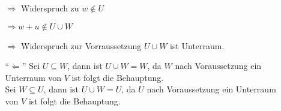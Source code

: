 \documentclass{scrreprt}
\begin{document}
\begin{enumerate}[(a)]
\begin{itemize}
\begin{minipage}{0.4\textwidth}
      $\Rightarrow$ Widerspruch zu $w \notin U$
    \end{minipage}

    $\Rightarrow w + u \notin U \cup W$

    $\Rightarrow$ Widerspruch zur Vorraussetzung $U \cup W$ ist Unterraum.

  \item[``$\Leftarrow$''] Sei $U \subseteq W$, dann ist $U \cup W = W$,
    da $W$ nach Voraussetzung ein Unterraum von $V$ ist folgt die Behauptung. \\
    Sei $W \subseteq U$, dann ist $U \cup W = U$,
    da $U$ nach Voraussetzung ein Unterraum von $V$ ist folgt die Behauptung.
  \end{itemize}
\end{enumerate}
\end{document}
